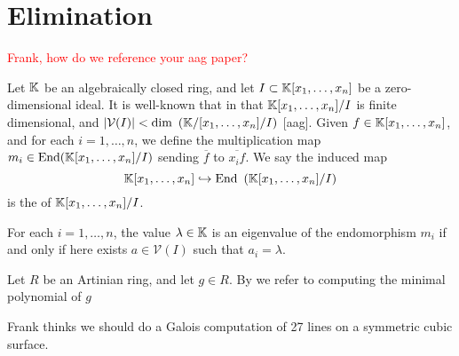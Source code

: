 


\section{Elimination}


\textcolor{red}{Frank, how do we reference your aag paper?}

Let $\mathbb{K}$ be an algebraically closed ring, and let $I\subset \mathbb{K}[x_{1},\dots,x_{n}]$ be a zero-dimensional ideal. It is well-known that in that $\mathbb{K}[x_{1},\dots,x_{n}]/I$ is finite dimensional, and $|\mathcal{V}(I)|< \text{dim }\left( \mathbb{K}/[x_{1},
\dots, x_{n}]/I \right)$ [aag]. Given $f\in \mathbb{K}[x_{1},\dots, x_{n}]$, and for each $i=1,\dots,n$, we define the multiplication map $m_{i}\in \text{End} (\mathbb{K}[x_{1},\dots, x_{n}]/I)$ sending $\overline{f}$ to $\overline{x_{i}f}$. We say the induced map \[\mathbb{K}[x_{1},\dots,x_{n}] \hookrightarrow \text{End }\left(\mathbb{K}[x_{1},\dots, x_{n}]/I \right)\] is the  of $\mathbb{K}[x_{1},\dots,x_{n}]/I$.

\begin{theorem} For each $i=1,\dots, n$, the value $\lambda \in \mathbb{K}$ is an eigenvalue of the endomorphism $m_{i}$ if and only if here exists $a\in \mathcal{V}(I)$ such that $a_{i}=\lambda$.
\end{theorem}

Let $R$ be an Artinian ring, and let $g\in R$. By  we refer to computing the minimal polynomial of $g$





%



{\color{red} Frank thinks we should do a Galois computation of 27 lines on a symmetric cubic surface.}


